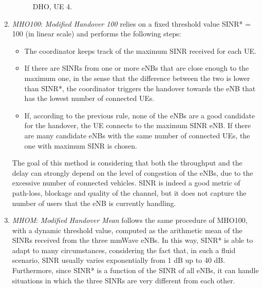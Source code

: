 \documentclass[conference,10pt]{IEEEtran}
\begin{document}
\begin{enumerate}
\begin{figure}[!t]
		\caption{DHO, UE 4.}
		\vspace*{-10pt}
\end{figure}

\item \emph{MHO100}:
\emph{Modified Handover 100} relies on a fixed threshold value SINR* = 100 (in linear scale) and performs the following steps:

\begin{itemize}
	\item The coordinator keeps track of the maximum SINR received for each UE.
	\item If there are SINRs from one or more eNBs that are close enough to the maximum one, in the sense that the difference between the two is lower than SINR*, the coordinator triggers the handover towards the eNB that has the lowest number of connected UEs.
	\item If, according to the previous rule, none of the eNBs are a good candidate for the handover, the UE connects to the maximum SINR eNB. If there are many candidate eNBs with the same number of connected UEs, the one with maximum SINR is chosen.
\end{itemize}

The goal of this method is considering that both the throughput and the delay can strongly depend on the level of congestion of the eNBs, due to the excessive number of connected vehicles. SINR is indeed a good metric of path-loss, blockage and quality of the channel, but it does not capture the number of users that the eNB is currently handling.

\item \emph{MHOM}:
\emph{Modified Handover Mean} follows the same procedure of MHO100, with a dynamic threshold value, computed as the arithmetic mean of the SINRs received from the three mmWave eNBs. In this way, SINR* is able to adapt to many circumstances, considering the fact that, in such a fluid scenario, SINR usually varies exponentially from 1 dB up to 40 dB. Furthermore, since SINR* is a function of the SINR of all eNBs, it can handle situations in which the three SINRs are very different from each other.


\end{enumerate}
\end{document}
